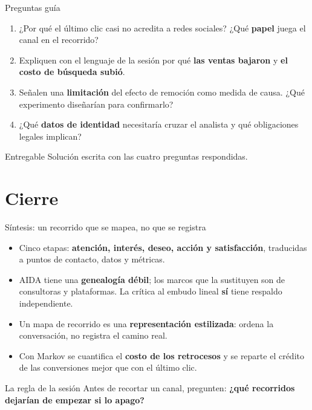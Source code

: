\documentclass[aspectratio=169,xcolor=dvipsnames]{beamer}
\begin{document}
\begin{frame}{Preguntas guía}
\small
\begin{enumerate}
  \item ¿Por qué el último clic casi no acredita a redes sociales? ¿Qué \textbf{papel} juega el canal en el recorrido?
  \vspace{3pt}
  \item Expliquen con el lenguaje de la sesión por qué \textbf{las ventas bajaron} y \textbf{el costo de búsqueda subió}.
  \vspace{3pt}
  \item Señalen una \textbf{limitación} del efecto de remoción como medida de causa. ¿Qué experimento diseñarían para confirmarlo?
  \vspace{3pt}
  \item ¿Qué \textbf{datos de identidad} necesitaría cruzar el analista y qué obligaciones legales implican?
\end{enumerate}
\begin{alertblock}{Entregable}
  \small Solución escrita con las cuatro preguntas respondidas.
\end{alertblock}
\end{frame}

\section{Cierre}

\begin{frame}{Síntesis: un recorrido que se mapea, no que se registra}
\begin{itemize}
  \small
  \item Cinco etapas: \textbf{atención, interés, deseo, acción y satisfacción}, traducidas a puntos de contacto, datos y métricas.
  \item AIDA tiene una \textbf{genealogía débil}; los marcos que la sustituyen son de consultoras y plataformas. La crítica al embudo lineal \textbf{sí} tiene respaldo independiente.
  \item Un mapa de recorrido es una \textbf{representación estilizada}: ordena la conversación, no registra el camino real.
  \item Con Markov se cuantifica el \textbf{costo de los retrocesos} y se reparte el crédito de las conversiones mejor que con el último clic.
\end{itemize}
\vspace{4pt}
\begin{alertblock}{La regla de la sesión}
  \small Antes de recortar un canal, pregunten: \textbf{¿qué recorridos dejarían de empezar si lo apago?}
\end{alertblock}
\end{frame}
\end{document}
